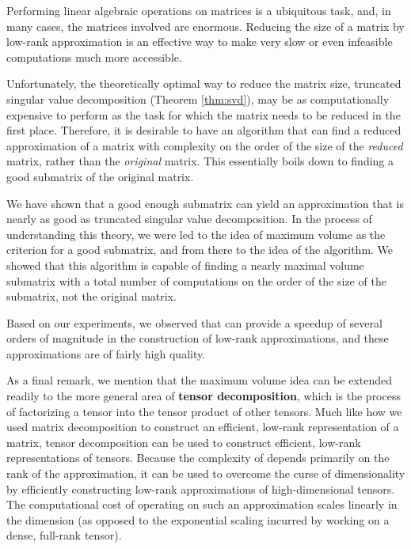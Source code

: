 \documentclass{article}
\begin{document}
	Performing linear algebraic operations on matrices is a ubiquitous task, and, in many cases, the matrices involved are enormous. Reducing the size of a matrix by low-rank approximation is an effective way to make very slow or even infeasible computations much more accessible.
	
	Unfortunately, the theoretically optimal way to reduce the matrix size, truncated singular value decomposition (Theorem \ref{thm:svd}), may be as computationally expensive to perform as the task for which the matrix needs to be reduced in the first place. Therefore, it is desirable to have an algorithm that can find a reduced approximation of a matrix with complexity on the order of the size of the \textit{reduced} matrix, rather than the \textit{original} matrix. This essentially boils down to finding a good submatrix of the original matrix.
	
	We have shown that a good enough submatrix can yield an approximation that is nearly as good as truncated singular value decomposition. In the process of understanding this theory, we were led to the idea of maximum volume as the criterion for a good submatrix, and from there to the idea of the \maxvol{} algorithm. We showed that this algorithm is capable of finding a nearly maximal volume submatrix with a total number of computations on the order of the size of the submatrix, not the original matrix.
	
	Based on our experiments, we observed that \maxvol{} can provide a speedup of several orders of magnitude in the construction of low-rank approximations, and these approximations are of fairly high quality.
	
	As a final remark, we mention that the maximum volume idea can be extended readily to the more general area of \textbf{tensor decomposition}, which is the process of factorizing a tensor into the tensor product of other tensors. Much like how we used matrix decomposition to construct an efficient, low-rank representation of a matrix, tensor decomposition can be used to construct efficient, low-rank representations of tensors. Because the complexity of \maxvol{} depends primarily on the rank of the approximation, it can be used to overcome the curse of dimensionality by efficiently constructing low-rank approximations of high-dimensional tensors. The computational cost of operating on such an approximation scales linearly in the dimension (as opposed to the exponential scaling incurred by working on a dense, full-rank tensor).
	
	
\end{document}
